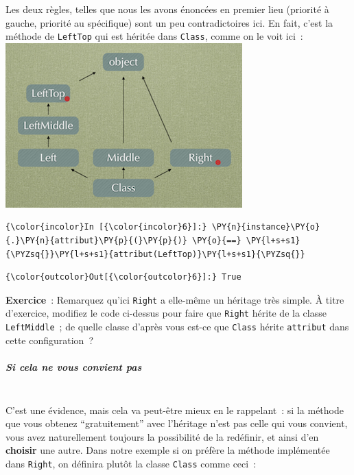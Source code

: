     Les deux règles, telles que nous les avons énoncées en premier lieu
(priorité à gauche, priorité au spécifique) sont un peu contradictoires
ici. En fait, c'est la méthode de \texttt{LeftTop} qui est héritée dans
\texttt{Class}, comme on le voit ici~:\\

\includegraphics{medias/heritage-multiple01.png}

    \begin{Verbatim}[commandchars=\\\{\}]
{\color{incolor}In [{\color{incolor}6}]:} \PY{n}{instance}\PY{o}{.}\PY{n}{attribut}\PY{p}{(}\PY{p}{)} \PY{o}{==} \PY{l+s+s1}{\PYZsq{}}\PY{l+s+s1}{attribut(LeftTop)}\PY{l+s+s1}{\PYZsq{}}
\end{Verbatim}


\begin{Verbatim}[commandchars=\\\{\}]
{\color{outcolor}Out[{\color{outcolor}6}]:} True
\end{Verbatim}
            
    \textbf{Exercice}~: Remarquez qu'ici \texttt{Right} a elle-même un
héritage très simple. À titre d'exercice, modifiez le code ci-dessus
pour faire que \texttt{Right} hérite de la classe \texttt{LeftMiddle}~;
de quelle classe d'après vous est-ce que \texttt{Class} hérite
\texttt{attribut} dans cette configuration~?

    \hypertarget{si-cela-ne-vous-convient-pas}{%
\subparagraph{Si cela ne vous convient
pas\\\\}\label{si-cela-ne-vous-convient-pas}}

    C'est une évidence, mais cela va peut-être mieux en le rappelant~: si la
méthode que vous obtenez ``gratuitement'' avec l'héritage n'est pas
celle qui vous convient, vous avez naturellement toujours la possibilité
de la redéfinir, et ainsi d'en \textbf{choisir} une autre. Dans notre
exemple si on préfère la méthode implémentée dans \texttt{Right}, on
définira plutôt la classe \texttt{Class} comme ceci~:

